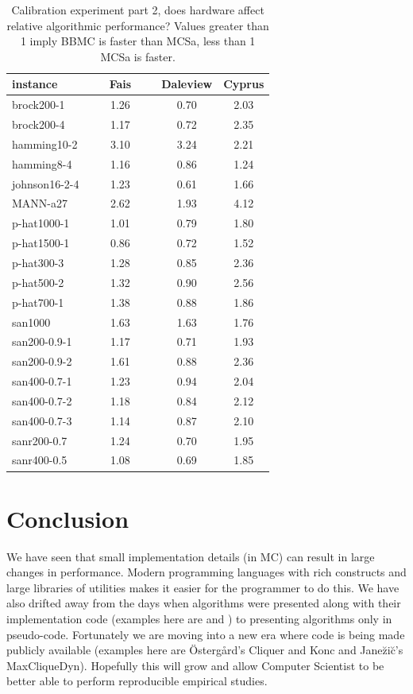\documentclass{l4proj}
\begin{document}
\begin{table}
\begin{center}
\begin{tabular}{|l|c|c|c|}  \hline
instance & ~~~Fais~~~ & Daleview & Cyprus \\ \hline
brock200-1 & 1.26  & 0.70  & 2.03  \\ 
brock200-4 & 1.17  & 0.72  & 2.35  \\ 
hamming10-2 & 3.10  & 3.24  & 2.21  \\ 
hamming8-4 & 1.16  & 0.86  & 1.24  \\ 
johnson16-2-4 & 1.23  & 0.61  & 1.66  \\ 
MANN-a27 & 2.62  & 1.93  & 4.12  \\ 
p-hat1000-1 & 1.01  & 0.79  & 1.80  \\ 
p-hat1500-1 & 0.86  & 0.72  & 1.52  \\ 
p-hat300-3 & 1.28  & 0.85  & 2.36  \\ 
p-hat500-2 & 1.32  & 0.90  & 2.56  \\ 
p-hat700-1 & 1.38  & 0.88  & 1.86  \\ 
san1000 & 1.63  & 1.63  & 1.76  \\ 
san200-0.9-1 & 1.17  & 0.71  & 1.93  \\ 
san200-0.9-2 & 1.61  & 0.88  & 2.36  \\ 
san400-0.7-1 & 1.23  & 0.94  & 2.04  \\ 
san400-0.7-2 & 1.18  & 0.84  & 2.12  \\ 
san400-0.7-3 & 1.14  & 0.87  & 2.10  \\ 
sanr200-0.7 & 1.24  & 0.70  & 1.95  \\ 
sanr400-0.5 & 1.08  & 0.69  & 1.85  \\ \hline
\end{tabular}
\end{center}
\caption{Calibration experiment part 2, does hardware affect relative algorithmic performance? 
Values greater than 1 imply BBMC is faster than MCSa, less than 1 MCSa is faster.}
\label{calibrationAlg}
\end{table}

\chapter{Conclusion}
\vspace{-1.5mm}
We have seen that small implementation details (in MC) can result in large changes in performance. Modern
programming languages with rich constructs and large libraries of utilities makes it easier for the programmer
to do this. We have also drifted away from the days when algorithms were presented along with their 
implementation code (examples here are \cite{bk73} and \cite{pardalosRodgers92}) to presenting algorithms only in
pseudo-code. Fortunately we are moving into a new era where code is being made publicly available (examples here are 
\"{O}sterg\aa{}rd's Cliquer and Konc and Jane\u{z}i\u{c}'s MaxCliqueDyn). Hopefully this will 
grow and allow Computer Scientist to be better able to perform reproducible empirical studies.
\end{document}
